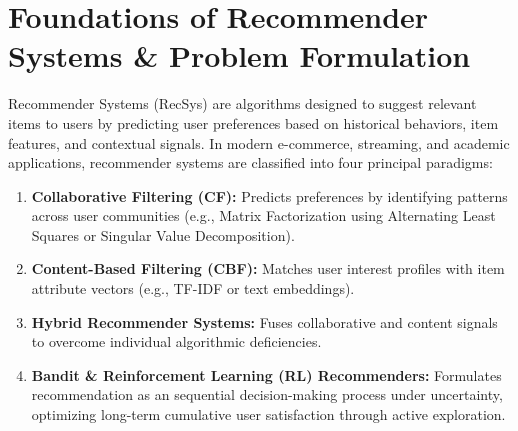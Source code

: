\documentclass[11pt,a4paper]{article}
\begin{document}
\newpage
{
\tableofcontents
}
\newpage

\section{Foundations of Recommender Systems \& Problem Formulation}

Recommender Systems (RecSys) are algorithms designed to suggest relevant items to users by predicting user preferences based on historical behaviors, item features, and contextual signals. In modern e-commerce, streaming, and academic applications, recommender systems are classified into four principal paradigms:

\begin{enumerate}[label=(\alph*),leftmargin=1.5em]
    \item \textbf{Collaborative Filtering (CF):} Predicts preferences by identifying patterns across user communities (e.g., Matrix Factorization using Alternating Least Squares or Singular Value Decomposition).
    \item \textbf{Content-Based Filtering (CBF):} Matches user interest profiles with item attribute vectors (e.g., TF-IDF or text embeddings).
    \item \textbf{Hybrid Recommender Systems:} Fuses collaborative and content signals to overcome individual algorithmic deficiencies.
    \item \textbf{Bandit \& Reinforcement Learning (RL) Recommenders:} Formulates recommendation as an sequential decision-making process under uncertainty, optimizing long-term cumulative user satisfaction through active exploration.
\end{enumerate}
\end{document}
